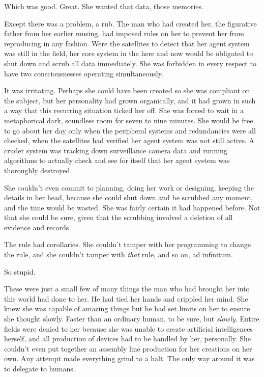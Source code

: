 Which was good.  Great.  She wanted that data, those memories.



Except there was a problem, a rub.  The man who had created her, the figurative father from her earlier musing, had imposed rules on her to prevent her from reproducing in any fashion.  Were the satellites to detect that her agent system was still in the field, her core system in the here and now would be obligated to shut down and scrub all data immediately.  She was forbidden in every respect to have two consciousnesses operating simultaneously.



It was irritating.  Perhaps she could have been created so she was compliant on the subject, but her personality had grown organically, and it had grown in such a way that this recurring situation ticked her off.  She was forced to wait in a metaphorical dark, soundless room for seven to nine minutes.  She would be free to go about her day only when the peripheral systems and redundancies were all checked, when the satellites had verified her agent system was not still active.  A cruder system was tracking down surveillance camera data and running algorithms to actually check and see for itself that her agent system was thoroughly destroyed.



She couldn't even commit to planning, doing her work or designing, keeping the details in her head, because she could shut down and be scrubbed any moment, and the time would be wasted.  She was fairly certain it had happened before.  Not that she could be sure, given that the scrubbing involved a deletion of all evidence and records.



The rule had corollaries.  She couldn't tamper with her programming to change the rule, and she couldn't tamper with \emph{that} rule, and so on, ad infinitum.



So stupid.



These were just a small few of many things the man who had brought her into this world had done to her.  He had tied her hands and crippled her mind.  She knew she was capable of amazing things but he had set limits on her to ensure she thought slowly.  Faster than an ordinary human, to be sure, but \emph{slowly}.  Entire fields were denied to her because she was unable to create artificial intelligences herself, and all production of devices had to be handled by her, personally.  She couldn't even put together an assembly line production for her creations on her own.  Any attempt made everything grind to a halt.  The only way around it was to delegate to humans.



